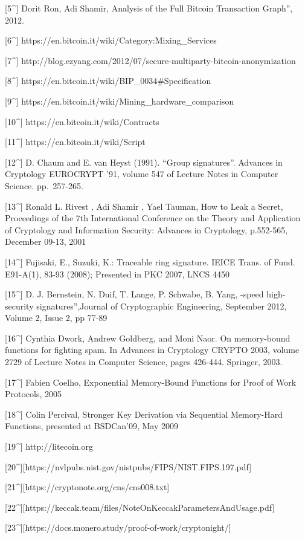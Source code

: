 \documentclass[
]{article}
\begin{document}
{[}5\^{}{]} Dorit Ron, Adi Shamir, \Quantitative Analysis of the Full
Bitcoin Transaction Graph'', 2012.

{[}6\^{}{]} https://en.bitcoin.it/wiki/Category:Mixing\_Services

{[}7\^{}{]}
http://blog.ezyang.com/2012/07/secure-multiparty-bitcoin-anonymization

{[}8\^{}{]} https://en.bitcoin.it/wiki/BIP\_0034\#Specification

{[}9\^{}{]} https://en.bitcoin.it/wiki/Mining\_hardware\_comparison

{[}10\^{}{]} https://en.bitcoin.it/wiki/Contracts

{[}11\^{}{]} https://en.bitcoin.it/wiki/Script

{[}12\^{}{]} D. Chaum and E. van Heyst (1991). ``Group signatures''.
Advances in Cryptology\textbar{} EUROCRYPT '91, volume 547 of Lecture
Notes in Computer Science. pp.~257-265.

{[}13\^{}{]} Ronald L. Rivest , Adi Shamir , Yael Tauman, How to Leak a
Secret, Proceedings of the 7th International Conference on the Theory
and Application of Cryptology and Information Security: Advances in
Cryptology, p.552-565, December 09-13, 2001

{[}14\^{}{]} Fujisaki, E., Suzuki, K.: Traceable ring signature. IEICE
Trans. of Fund. E91-A(1), 83-93 (2008); Presented in PKC 2007, LNCS 4450

{[}15\^{}{]} D. J. Bernstein, N. Duif, T. Lange, P. Schwabe, B. Yang,
\High-speed high-security signatures'',Journal of Cryptographic
Engineering, September 2012, Volume 2, Issue 2, pp 77-89

{[}16\^{}{]} Cynthia Dwork, Andrew Goldberg, and Moni Naor. On
memory-bound functions for fighting spam. In Advances in Cryptology
\textbar{} CRYPTO 2003, volume 2729 of Lecture Notes in Computer
Science, pages 426-444. Springer, 2003.

{[}17\^{}{]} Fabien Coelho, Exponential Memory-Bound Functions for Proof
of Work Protocols, 2005

{[}18\^{}{]} Colin Percival, Stronger Key Derivation via Sequential
Memory-Hard Functions, presented at BSDCan'09, May 2009

{[}19\^{}{]} http://litecoin.org

{[}20\^{}{]}{[}https://nvlpubs.nist.gov/nistpubs/FIPS/NIST.FIPS.197.pdf{]}

{[}21\^{}{]}{[}https://cryptonote.org/cns/cns008.txt{]}

{[}22\^{}{]}{[}https://keccak.team/files/NoteOnKeccakParametersAndUsage.pdf{]}

{[}23\^{}{]}{[}https://docs.monero.study/proof-of-work/cryptonight/{]}
\end{document}
